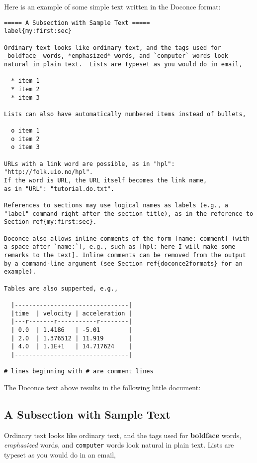 \documentclass[%
oneside,                 %
final,                   %
10pt]{article}
\begin{document}
\noindent
Here is an example of some simple text written in the Doconce format:
\begin{Verbatim}[fontsize=\fontsize{9pt}{9pt},tabsize=8,baselinestretch=0.85,
fontfamily=tt,xleftmargin=7mm]
===== A Subsection with Sample Text =====
label{my:first:sec}

Ordinary text looks like ordinary text, and the tags used for
_boldface_ words, *emphasized* words, and `computer` words look
natural in plain text.  Lists are typeset as you would do in email,

  * item 1
  * item 2
  * item 3

Lists can also have automatically numbered items instead of bullets,

  o item 1
  o item 2
  o item 3

URLs with a link word are possible, as in "hpl": "http://folk.uio.no/hpl".
If the word is URL, the URL itself becomes the link name,
as in "URL": "tutorial.do.txt".

References to sections may use logical names as labels (e.g., a
"label" command right after the section title), as in the reference to
Section ref{my:first:sec}.

Doconce also allows inline comments of the form [name: comment] (with
a space after `name:`), e.g., such as [hpl: here I will make some
remarks to the text]. Inline comments can be removed from the output
by a command-line argument (see Section ref{doconce2formats} for an
example).

Tables are also supperted, e.g.,

  |--------------------------------|
  |time  | velocity | acceleration |
  |---r-------r-----------r--------|
  | 0.0  | 1.4186   | -5.01        |
  | 2.0  | 1.376512 | 11.919       |
  | 4.0  | 1.1E+1   | 14.717624    |
  |--------------------------------|

# lines beginning with # are comment lines
\end{Verbatim}
\noindent
The Doconce text above results in the following little document:

\subsection{A Subsection with Sample Text}

\label{my:first:sec}

Ordinary text looks like ordinary text, and the tags used for
\textbf{boldface} words, \emph{emphasized} words, and {\fontsize{10pt}{10pt}\Verb!computer!} words look
natural in plain text.  Lists are typeset as you would do in an email,
\end{document}
